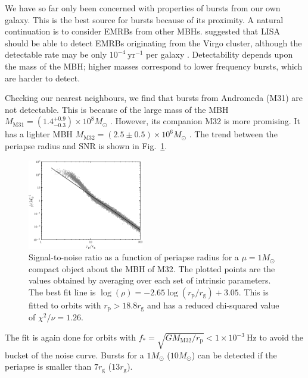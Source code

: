 \documentclass[useAMS,usedcolumn,usegraphicx,usenatbib]{mn2e}
\newcommand{\figref}[1]{Fig.~\ref{fig:#1}}
\newcommand{\units}[1]{\ensuremath{~\mathrm{#1}}}
\newcommand{\sub}[1]{\ensuremath{_\mathrm{#1}}}
\begin{document}
We have so far only been concerned with properties of bursts from our own galaxy. This is the best source for bursts because of its proximity. A natural continuation is to consider EMRBs from other MBHs. \citet{Rubbo2006} suggested that LISA should be able to detect EMRBs originating from the Virgo cluster, although the detectable rate may be only $10^{-4}\units{yr^{-1}}$ per galaxy \citep{Hopman2007}. Detectability depends upon the mass of the MBH; higher masses correspond to lower frequency bursts, which are harder to detect.

Checking our nearest neighbours, we find that bursts from Andromeda (M31) are not detectable. This is because of the large mass of the MBH $M\sub{M31} = (1.4^{+0.9}_{-0.3}) \times 10^8 M_\odot$ \citep{Bender2005}. However, its companion M32 is more promising. It has a lighter MBH $M\sub{M32} = (2.5 \pm 0.5) \times 10^6 M_\odot$ \citep{Verolme2002}. The trend between the periapse radius and SNR is shown in \figref{SNR-M32}.
\begin{figure}
  \begin{center}
  \includegraphics[width=0.45\textwidth]{Fig_SNR_M32}
    \caption{Signal-to-noise ratio as a function of periapse radius for a $\mu = 1 M_\odot$ compact object about the MBH of M32. The plotted points are the values obtained by averaging over each set of intrinsic parameters. The best fit line is $\log\left(\rho\right) = -2.65\log(r\sub{p}/r\sub{g}) + 3.05$. This is fitted to orbits with $r\sub{p} > 18.8 r\sub{g}$ and has a reduced chi-squared value of $\chi^2/\nu = 1.26$.}
    \label{fig:SNR-M32}
  \end{center}
\end{figure}
The fit is again done for orbits with $f_\ast = \sqrt{GM\sub{M32}/r\sub{p}} < 1 \times 10^{-3}\units{Hz}$ to avoid the bucket of the noise curve. Bursts for a $1 M_\odot$ ($10 M_\odot$) can be detected if the periapse is smaller than $7 r\sub{g}$ ($13 r\sub{g}$).
\end{document}
